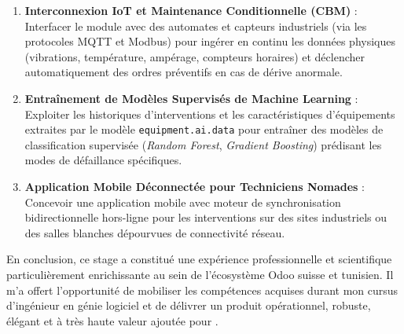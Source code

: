 \begin{enumerate}[leftmargin=1.2cm, label=\textbf{\arabic*.}]
    \item \textbf{Interconnexion IoT et Maintenance Conditionnelle (CBM)} : Interfacer le module avec des automates et capteurs industriels (via les protocoles MQTT et Modbus) pour ingérer en continu les données physiques (vibrations, température, ampérage, compteurs horaires) et déclencher automatiquement des ordres préventifs en cas de dérive anormale.
    \item \textbf{Entraînement de Modèles Supervisés de Machine Learning} : Exploiter les historiques d'interventions et les caractéristiques d'équipements extraites par le modèle \texttt{equipment.ai.data} pour entraîner des modèles de classification supervisée (\textit{Random Forest}, \textit{Gradient Boosting}) prédisant les modes de défaillance spécifiques.
    \item \textbf{Application Mobile Déconnectée pour Techniciens Nomades} : Concevoir une application mobile avec moteur de synchronisation bidirectionnelle hors-ligne pour les interventions sur des sites industriels ou des salles blanches dépourvues de connectivité réseau.
\end{enumerate}

En conclusion, ce stage a constitué une expérience professionnelle et scientifique particulièrement enrichissante au sein de l'écosystème Odoo suisse et tunisien. Il m'a offert l'opportunité de mobiliser les compétences acquises durant mon cursus d'ingénieur en génie logiciel et de délivrer un produit opérationnel, robuste, élégant et à très haute valeur ajoutée pour \textbf{\companyName}.